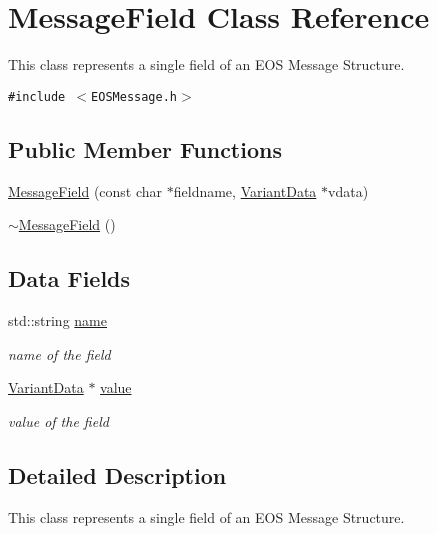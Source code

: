 \hypertarget{classMessageField}{
\section{MessageField Class Reference}
\label{classMessageField}
}
This class represents a single field of an EOS Message Structure.  


{\tt \#include $<$EOSMessage.h$>$}

\subsection*{Public Member Functions}
\begin{CompactItemize}
\item 
\hyperlink{classMessageField_ed47fc5d3fa9f97a88a4875cb72f6112}{MessageField} (const char $\ast$fieldname, \hyperlink{classVariantData}{VariantData} $\ast$vdata)
\item 
\hyperlink{classMessageField_315f714e7d335b82720d6015b12bab31}{$\sim$MessageField} ()
\end{CompactItemize}
\subsection*{Data Fields}
\begin{CompactItemize}
\item 
std::string \hyperlink{classMessageField_86e5327bd97c0ce8a60faf292026b856}{name}
\begin{CompactList}\small\item\em name of the field \item\end{CompactList}\item 
\hyperlink{classVariantData}{VariantData} $\ast$ \hyperlink{classMessageField_00e1559f3b65ceee59d27ba99dd5e2c0}{value}
\begin{CompactList}\small\item\em value of the field \item\end{CompactList}\end{CompactItemize}


\subsection{Detailed Description}
This class represents a single field of an EOS Message Structure. 

